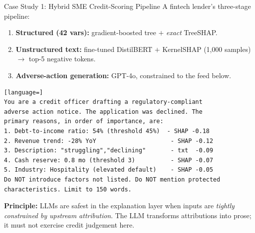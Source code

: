 \documentclass[9pt,t]{beamer}
\begin{document}
\begin{frame}[fragile]{Case Study 1: Hybrid SME Credit-Scoring Pipeline}
A fintech lender's three-stage pipeline:
\begin{enumerate}\small
  \item \textbf{Structured (42 vars):} gradient-boosted tree $+$ \emph{exact} TreeSHAP.
  \item \textbf{Unstructured text:} fine-tuned DistilBERT $+$ KernelSHAP (1{,}000 samples) $\to$ top-5 negative tokens.
  \item \textbf{Adverse-action generation:} GPT-4o, constrained to the feed below.
\end{enumerate}

\begin{lstlisting}[language=]
You are a credit officer drafting a regulatory-compliant
adverse action notice. The application was declined. The
primary reasons, in order of importance, are:
1. Debt-to-income ratio: 54% (threshold 45%)  - SHAP -0.18
2. Revenue trend: -28% YoY                     - SHAP -0.12
3. Description: "struggling","declining"       - txt  -0.09
4. Cash reserve: 0.8 mo (threshold 3)          - SHAP -0.07
5. Industry: Hospitality (elevated default)    - SHAP -0.05
Do NOT introduce factors not listed. Do NOT mention protected
characteristics. Limit to 150 words.
\end{lstlisting}

\textbf{Principle:} LLMs are safest in the explanation layer when inputs are
\emph{tightly constrained by upstream attribution}. The LLM transforms
attributions into prose; it must not exercise credit judgement here.
\end{frame}
\end{document}

